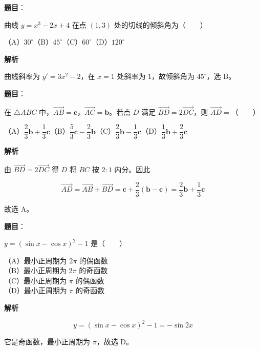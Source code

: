 \begin{answer}

\textbf{题目}：

曲线 $y=x^3-2x+4$ 在点 $(1,3)$ 处的切线的倾斜角为\mbox{（　　）}

（A）$30^\circ$\quad（B）$45^\circ$\quad（C）$60^\circ$\quad（D）$120^\circ$

\textbf{解析}

曲线斜率为 $y'=3x^2-2$，在 $x=1$ 处斜率为 $1$，故倾斜角为 $45^\circ$，选 B。


\end{answer}
\begin{answer}

\textbf{题目}：

在 $\triangle ABC$ 中，$\overrightarrow{AB}=\boldsymbol c$，$\overrightarrow{AC}=\boldsymbol b$。若点 $D$ 满足 $\overrightarrow{BD}=2\overrightarrow{DC}$，则 $\overrightarrow{AD}=$\mbox{（　　）}

（A）$\dfrac23\boldsymbol b+\dfrac13\boldsymbol c$\quad（B）$\dfrac53\boldsymbol c-\dfrac23\boldsymbol b$\quad（C）$\dfrac23\boldsymbol b-\dfrac13\boldsymbol c$\quad（D）$\dfrac13\boldsymbol b+\dfrac23\boldsymbol c$

\textbf{解析}

由 $\overrightarrow{BD}=2\overrightarrow{DC}$ 得 $D$ 将 $BC$ 按 $2:1$ 内分。因此

\nopagebreak[4]
\[
\overrightarrow{AD}=\overrightarrow{AB}+\overrightarrow{BD}
=\boldsymbol c+\frac23(\boldsymbol b-\boldsymbol c)
=\frac23\boldsymbol b+\frac13\boldsymbol c
\]

故选 A。


\end{answer}
\begin{answer}

\textbf{题目}：

$y=(\sin x-\cos x)^2-1$ 是\mbox{（　　）}

（A）最小正周期为 $2\pi$ 的偶函数\\
（B）最小正周期为 $2\pi$ 的奇函数\\
（C）最小正周期为 $\pi$ 的偶函数\\
（D）最小正周期为 $\pi$ 的奇函数

\textbf{解析}

\nopagebreak[4]
\[
y=(\sin x-\cos x)^2-1=-\sin2x
\]

它是奇函数，最小正周期为 $\pi$，故选 D。


\end{answer}
